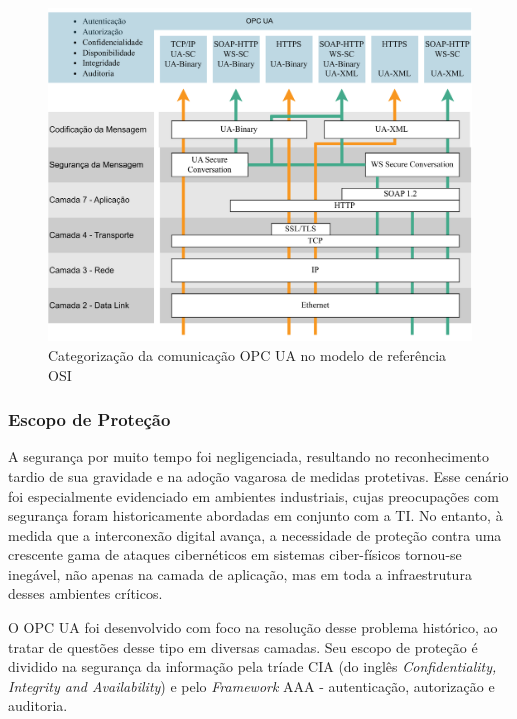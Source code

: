         \begin{figure}[htbp]
            \caption{Categorização da comunicação OPC UA no modelo de referência OSI}
            \label{fig:ua-osi}
            \begin{center}
                \includegraphics[width=0.9\linewidth]{USPSC-img/ua-osi.png}
            \end{center}
        \end{figure}

        \subsubsection{Escopo de Proteção}

        A segurança por muito tempo foi negligenciada, resultando no reconhecimento tardio de sua gravidade e na adoção vagarosa de medidas protetivas. Esse cenário foi especialmente evidenciado em ambientes industriais, cujas preocupações com segurança foram historicamente abordadas em conjunto com a TI. No entanto, à medida que a interconexão digital avança, a necessidade de proteção contra uma crescente gama de ataques cibernéticos em sistemas ciber-físicos tornou-se inegável, não apenas na camada de aplicação, mas em toda a infraestrutura desses ambientes críticos.
        
        O OPC UA foi desenvolvido com foco na resolução desse problema histórico, ao tratar de questões desse tipo em diversas camadas. Seu escopo de proteção é dividido na segurança da informação pela tríade CIA (do inglês \textit{Confidentiality, Integrity and Availability}) e pelo \textit{Framework} AAA - autenticação, autorização e auditoria.
        
